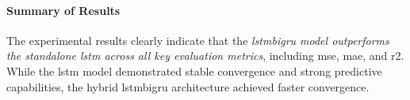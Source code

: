 \paragraph{Summary of Results} The experimental results clearly indicate that the \emph{\acrshort{lstmbigru} model 
outperforms the standalone \acrshort{lstm} across all key evaluation metrics}, including \acrshort{mse}, 
\acrshort{mae}, and \acrshort{r2}. While the \acrshort{lstm} model demonstrated stable convergence and strong
predictive capabilities, the hybrid \acrshort{lstmbigru} architecture achieved faster convergence.
